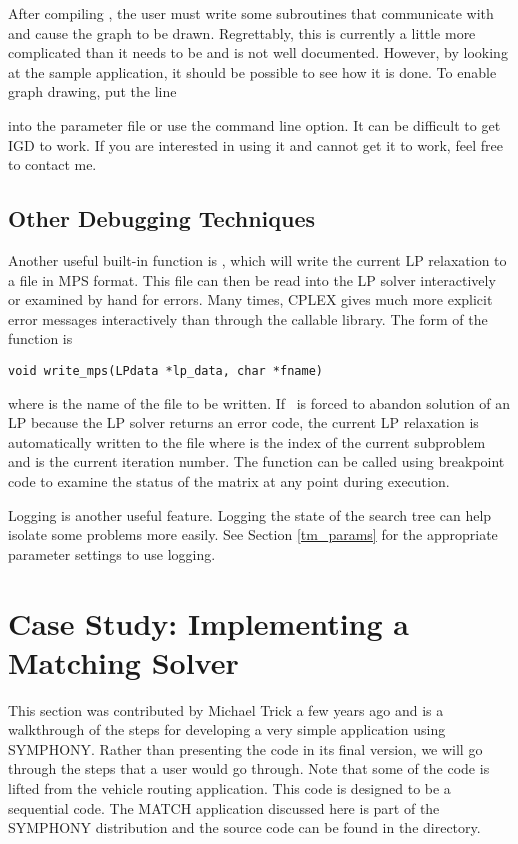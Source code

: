 After compiling , the user must write some subroutines that
communicate with  and cause the graph to be drawn.
Regrettably, this is currently a little more complicated than it needs
to be and is not well documented. However, by looking at the sample
application, it should be possible to see how it is done. To
enable graph drawing, put the line { into the
parameter file or use the  command line option. It can be difficult to
get IGD to work. If you are interested in using it and cannot get it to work,
feel free to contact me.

\subsection{Other Debugging Techniques}

Another useful built-in function is , which will write the
current LP relaxation to a file in MPS format. This file can then be read into
the LP solver interactively or examined by hand for errors.  Many times, CPLEX
gives much more explicit error messages interactively than through the
callable library. The form of the function is
{\color{Brown}
\begin{verbatim}
void write_mps(LPdata *lp_data, char *fname)
\end{verbatim}
} where  is the name of the file to be written. If \BB\ is forced
to abandon solution of an LP because the LP solver returns an error code, the
current LP relaxation is automatically written to the file
 where  is the index
of the current subproblem and  is the current iteration
number. The  function can be called using breakpoint code
to examine the status of the matrix at any point during execution.

Logging is another useful feature. Logging the state of the search tree can
help isolate some problems more easily. See Section \ref{tm_params}
for the appropriate parameter settings to use logging.

\section{Case Study: Implementing a Matching Solver}

This section was contributed by Michael Trick a few years ago and is a
walkthrough of the steps for developing a very simple application using
SYMPHONY. Rather than presenting the code in its final version, we will go
through the steps that a user would go through. Note that some of the code is
lifted from the vehicle routing application. This code is designed to be a
sequential code. The MATCH application discussed here is part of the SYMPHONY
distribution and the source code can be found in the
 directory.

}
